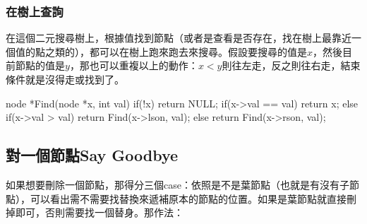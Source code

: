  \subsubsection{在樹上查詢}
 在這個二元搜尋樹上，根據值找到節點（或者是查看是否存在，找在樹上最靠近一個值的點之類的），都可以在樹上跑來跑去來搜尋。假設要搜尋的值是$x$，然後目前節點的值是$y$，那也可以重複以上的動作：$x < y$則往左走，反之則往右走，結束條件就是沒得走或找到了。
 \begin{C++}
node *Find(node *x, int val) {
    if(!x) return NULL;
    if(x->val == val) return x;
    else if(x->val > val) return Find(x->lson, val);
    else return Find(x->rson, val);
}
 \end{C++}
 \subsection{對一個節點Say Goodbye}
 如果想要刪除一個節點，那得分三個case：依照是不是葉節點（也就是有沒有子節點），可以看出需不需要找替換來遞補原本的節點的位置。如果是葉節點就直接刪掉即可，否則需要找一個替身。那作法：
 \begin{C++}
bool Delete(node *&root, node *x) {
 \end{C++}
